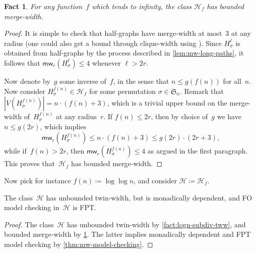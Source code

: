 \documentclass[a4paper,UKenglish,cleveref,thm-restate]{lipics-v2021}
\newtheorem{fact}[theorem]{Fact}
\theoremstyle{remark}
\newcommand{\eqdef}{\coloneqq}
\newcommand{\Hc}{\mathcal{H}}
\newcommand{\mw}{\mathsf{mw}}
\newcommand{\Perm}{\mathfrak{S}}
\begin{document}
\begin{fact}\label{fact:subdiv-mw}
    For any function~$f$ which tends to infinity, the class $\Hc_f$ has bounded merge-width.
\end{fact}
\begin{proof}
    It is simple to check that half-graphs have merge-width at most~3 at any radius
    (one could also get a bound through clique-width using \cite[Theorem~7.1]{merge-width}).
    Since $H_\sigma^\ell$ is obtained from half-graphs by the process described in \cref{lem:mw-long-paths},
    it follows that $\mw_r(H_\sigma^\ell) \le 4$ whenever $\ell > 2r$.

    Now denote by~$g$ some inverse of~$f$, in the sense that $n \le g(f(n))$ for all~$n$.
    Now consider $H_\sigma^{f(n)} \in \Hc_f$ for some permutation $\sigma \in \Perm_n$.
    Remark that $|V(H_\sigma^{f(n)})| = n \cdot (f(n)+3)$, which is a trivial upper bound on the merge-width of~$H_\sigma^{f(n)}$ at any radius~$r$.
    If $f(n) \le 2r$, then by choice of~$g$ we have $n \le g(2r)$, which implies
    \[ \mw_r(H_\sigma^{f(n)}) \le n \cdot (f(n)+3) \le g(2r) \cdot (2r+3), \]
    while if~$f(n) > 2r$, then $\mw_r(H_\sigma^{f(n)}) \le 4$ as argued in the first paragraph.
    This proves that~$\Hc_f$ has bounded merge-width.
\end{proof}

Now pick for instance $f(n) \eqdef \log\log n$, and consider $\Hc \eqdef \Hc_f$.
\begin{corollary}
    \label{cor:not-delin1}
    The class~$\Hc$ has unbounded twin-width, but is monadically dependent, and FO model checking in~$\Hc$ is FPT.
\end{corollary}
\begin{proof}
    The class~$\Hc$ has unbounded twin-width by \cref{fact:logn-subdiv-tww}, and bounded merge-width by \cref{fact:subdiv-mw}.
    The latter implies monadically dependent and FPT model checking by \cref{thm:mw-model-checking}.
\end{proof}
\end{document}
